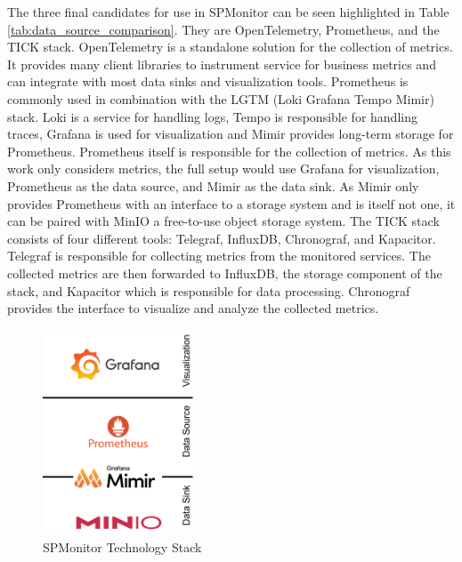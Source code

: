 The three final candidates for use in SPMonitor can be seen highlighted in Table \ref{tab:data_source_comparison}.
They are OpenTelemetry, Prometheus, and the TICK stack.
OpenTelemetry is a standalone solution for the collection of metrics. 
It provides many client libraries to instrument service for business metrics and can integrate
with most data sinks and visualization tools.
Prometheus is commonly used in combination with the LGTM (Loki Grafana Tempo Mimir) stack.
Loki is a service for handling logs, Tempo is responsible for handling traces, Grafana is used for visualization and Mimir provides
long-term storage for Prometheus. Prometheus itself is responsible for the collection of metrics.
As this work only considers metrics, the full setup would use Grafana for visualization, Prometheus as the data source, and Mimir
as the data sink. As Mimir only provides Prometheus with an interface to a storage system and is itself not one, it can be paired with MinIO
a free-to-use object storage system.
The TICK stack consists of four different tools: Telegraf, InfluxDB, Chronograf, and Kapacitor.
Telegraf is responsible for collecting metrics from the monitored services. The collected metrics are then forwarded
to InfluxDB, the storage component of the stack, and Kapacitor which is responsible for data processing.
Chronograf provides the interface to visualize and analyze the collected metrics.

\begin{figure}[h]
	\centering
	\includegraphics[width=0.4\textwidth]{figures/spmonitor_tech_stack.png}
	\caption{SPMonitor Technology Stack}
	\label{fig:spmonitor_tech_stack}
\end{figure}

